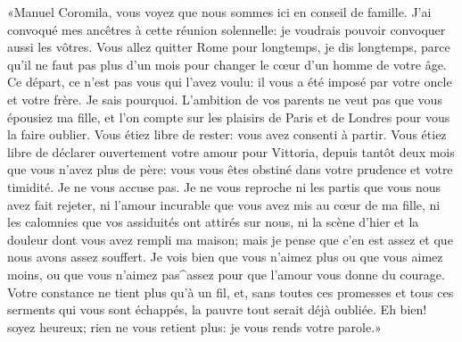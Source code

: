 «Manuel Coromila, vous voyez que nous sommes ici en conseil de famille.
J'ai convoqué mes ancêtres à cette réunion solennelle: je voudrais
pouvoir convoquer aussi les vôtres. Vous allez quitter Rome pour
longtemps, je dis longtemps, parce qu'il ne faut pas plus d'un mois pour
changer le cœur d'un homme de votre âge. Ce départ, ce n'est pas vous
qui l'avez voulu: il vous a été imposé par votre oncle et votre frère.
Je sais pourquoi. L'ambition de vos parents ne veut pas que vous
épousiez ma fille, et l'on compte sur les plaisirs de Paris et de
Londres pour vous la faire oublier. Vous étiez libre de rester: vous
avez consenti à partir. Vous étiez libre de déclarer ouvertement votre
amour pour Vittoria, depuis tantôt deux mois que vous n'avez plus de
père: vous vous êtes obstiné dans votre prudence et votre timidité. Je
ne vous accuse pas. Je ne vous reproche ni les partis que vous nous avez
fait rejeter, ni l'amour incurable que vous avez mis au cœur de ma
fille, ni les calomnies que vos assiduités ont attirés sur nous, ni la
scène d'hier et la douleur dont vous avez rempli ma maison; mais je
pense que c'en est assez et que nous avons assez souffert. Je vois bien
que vous n'aimez plus ou que vous aimez moins, ou que vous n'aimez
pas\^{}assez pour que l'amour vous donne du courage. Votre constance ne
tient plus qu'à un fil, et, sans toutes ces promesses et tous ces
serments qui vous sont échappés, la pauvre tout serait déjà oubliée. Eh
bien! soyez heureux; rien ne vous retient plus: je vous rends votre
parole.»
